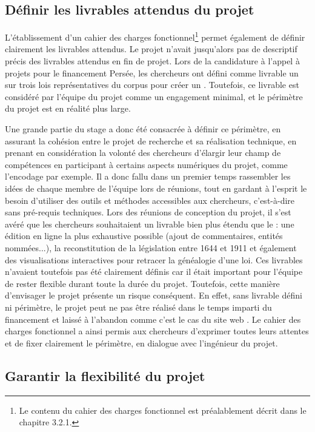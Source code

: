 \subsection{Définir les livrables attendus du projet}

L'établissement d'un cahier des charges fonctionnel\footnote{Le contenu du cahier des charges fonctionnel est préalablement décrit dans le chapitre 3.2.1.} permet également de définir clairement les livrables attendus. Le projet \COREL n'avait jusqu'alors pas de descriptif précis des livrables attendus en fin de projet. Lors de la candidature à l'appel à projets pour le financement \CollEx Persée, les chercheurs ont défini comme livrable un \POC sur trois lois représentatives du corpus pour créer un \cv. Toutefois, ce livrable est considéré par l'équipe du projet comme un engagement minimal, et le périmètre du projet est en réalité plus large. 

Une grande partie du stage a donc été consacrée à définir ce périmètre, en assurant la cohésion entre le projet de recherche et sa réalisation technique, en prenant en considération la volonté des chercheurs d'élargir leur champ de compétences en participant à certains aspects numériques du projet, comme l'encodage par exemple. Il a donc fallu dans un premier temps rassembler les idées de chaque membre de l'équipe lors de réunions, tout en gardant à l'esprit le besoin d'utiliser des outils et méthodes accessibles aux chercheurs, c'est-à-dire sans pré-requis techniques. Lors des réunions de conception du projet, il s'est avéré que les chercheurs souhaitaient un livrable bien plus étendu que le \POC : une édition en ligne la plus exhaustive possible (ajout de commentaires, entités nommées...), la reconstitution de la législation entre 1644 et 1911 et également des visualisations interactives pour retracer la généalogie d'une loi. Ces livrables n'avaient toutefois pas été clairement définis car il était important pour l'équipe de rester flexible durant toute la durée du projet. Toutefois, cette manière d'envisager le projet présente un risque conséquent. En effet, sans livrable défini ni périmètre, le projet peut ne pas être réalisé dans le temps imparti du financement et laissé à l'abandon comme c'est le cas du site web \LSC. Le cahier des charges fonctionnel a ainsi permis aux chercheurs d'exprimer toutes leurs attentes et de fixer clairement le périmètre, en dialogue avec l'ingénieur du projet. 

\subsection{Garantir la flexibilité du projet}

